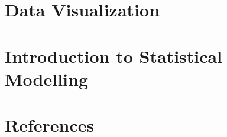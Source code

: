 \documentclass[
  letterpaper,
  DIV=11,
  numbers=noendperiod]{scrreprt}
\newlength{\cslhangindent}
\newenvironment{CSLReferences}[2] %
 {\begin{list}{}{%
  \setlength{\itemindent}{0pt}
  \setlength{\leftmargin}{0pt}
  \setlength{\parsep}{0pt}
  \ifodd #1
   \setlength{\leftmargin}{\cslhangindent}
   \setlength{\itemindent}{-1\cslhangindent}
  \fi
  \setlength{\itemsep}{#2\baselineskip}}}
 {\end{list}}
\begin{document}

\chapter{Data Visualization}\label{data-visualization}


\chapter{Introduction to Statistical
Modelling}\label{introduction-to-statistical-modelling}


\chapter*{References}\label{references}


\label{refs}
\begin{CSLReferences}{0}{1}
\end{CSLReferences}
\end{document}
